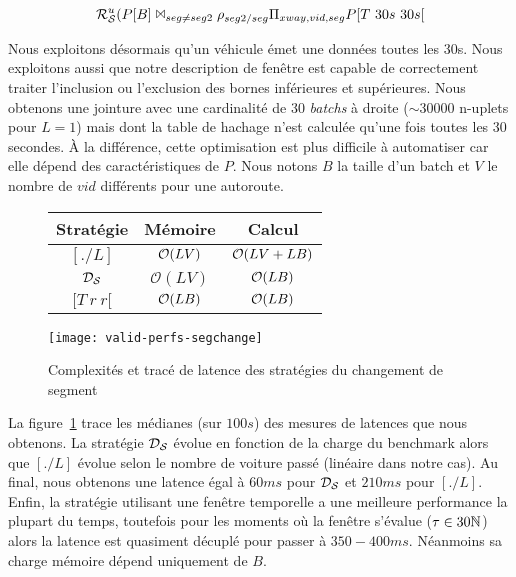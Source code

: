 $$\mathcal{R}_{\mathcal S}^{u}(P[B] \Join_{seg\neq seg2} \rho_{seg2/seg} \Pi_{xway,vid,seg} P[T\ 30s\ 30s[$$

Nous exploitons désormais qu'un véhicule émet une données toutes les 30s. Nous exploitons aussi que notre description de fenêtre est capable de correctement traiter l'inclusion ou l'exclusion des bornes inférieures et supérieures. Nous obtenons une jointure avec une cardinalité de 30 \textit{batchs} à droite ($\sim$30000 n-uplets pour $L=1$) mais dont la table de hachage n'est calculée qu'une fois toutes les 30 secondes. À la différence, cette optimisation est plus difficile à automatiser car elle dépend des caractéristiques de $P$. Nous notons $B$ la taille d'un batch et $V$ le nombre de $vid$ différents pour une autoroute.


\begin{figure}[ht]
\centering
\begin{minipage}{0.44\textwidth}
\begin{tabular}{|c|c|c|}\bottomrule
\rowcolor{hypcolor} Stratégie & Mémoire & Calcul \\ \hline
$[./L]$ & $\mathcal{O}(LV)$ & $\mathcal{O}(LV+LB)$ \\\hline
$\mathcal{D_S}$ & $\mathcal O(LV)$ & $\mathcal{O}(LB)$  \\\hline
$[T\ r\ r[$ & $\mathcal{O}(LB)$ & $\mathcal{O}(LB)$\\ \toprule
\end{tabular}
\end{minipage}
\begin{minipage}{0.55\textwidth}
\texttt{[image: valid-perfs-segchange]}
\end{minipage}
\caption{Complexités et tracé de latence des stratégies du changement de segment}\label{fig:valid:perfs:segchange}
\end{figure}

La figure~\ref{fig:valid:perfs:segchange} trace les médianes (sur $100s$) des mesures de latences que nous obtenons. La stratégie $\mathcal{D_S}$ évolue en fonction de la charge du benchmark alors que $[./L]$ évolue selon le nombre de voiture passé (linéaire dans notre cas). Au final, nous obtenons une latence égal à $60ms$ pour $\mathcal{D_S}$ et $210ms$ pour $[./L]$. Enfin, la stratégie utilisant une fenêtre temporelle a une meilleure performance la plupart du temps, toutefois pour les moments où la fenêtre s'évalue ($\tau\in 30\mathbb{N}$) alors la latence est quasiment décuplé pour passer à $350-400ms$. Néanmoins sa charge mémoire dépend uniquement de $B$.

